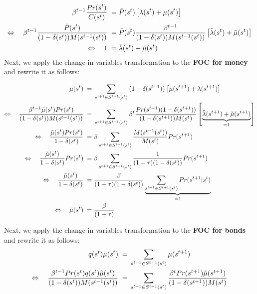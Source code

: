 \documentclass[a4paper, 12pt]{article}
\begin{document}
\begin{Answer}
	\begin{align}%
		\beta^{t-1} \frac{Pr(s^t)}{C(s^t)} \; = & \; \bar{P}(s^t) \left[ \lambda(s^t) + \mu(s^t) \right]\notag\\%
		\Leftrightarrow \quad \beta^{t-1} \frac{\bar{P}(s^t)}{(1-\delta(s^t)) M(s^{t-1}(s^t))} \; = & \; \bar{P}(s^t) \frac{\beta^{t-1}}{(1-\delta(s^t)) M(s^{t-1}(s^t))} \left[ \tilde{\lambda}(s^t) + \tilde{\mu}(s^t) \right]\notag\\%
		\Leftrightarrow \quad 1 \; = & \; \tilde{\lambda}(s^t) + \tilde{\mu}(s^t)\label{eq:foc_consumption}%
	\end{align}%
	Next, we apply the change-in-variables transformation to the \textbf{FOC for money} and rewrite it as follows:%
	\begin{footnotesize}%
	\begin{align}%
		\mu(s^t) \; = & \; \sum_{s^{t+1} \in S^{t+1}(s^t)} \left(1-\delta(s^{t+1}) \right) \left[ \mu(s^{t+1}) + \lambda(s^{t+1}) \right]\notag\\%
		\Leftrightarrow \quad \frac{\beta^{t-1} \tilde{\mu}(s^t) Pr(s^t)}{(1-\delta(s^t)) M(s^{t-1}(s^t))} \; = & \; \sum_{s^{t+1} \in S^{t+1}(s^t)} \beta^t \frac{Pr(s^{t+1})(1-\delta(s^{t+1}))}{(1-\delta(s^{t+1}))M(s^t)} \left[\underbrace{\tilde{\lambda}(s^{t+1}) + \tilde{\mu}(s^{t+1})}_{=1}\right]\notag\\%
		\Leftrightarrow \quad \frac{\tilde{\mu}(s^t) Pr(s^t)}{1-\delta(s^t)} \; = & \; \beta \sum_{s^{t+1} \in S^{t+1}(s^t)} \frac{M(s^{t-1}(s^t))}{M(s^t)} Pr(s^{t+1})\notag\\%
		\Leftrightarrow \quad \frac{\tilde{\mu}(s^t)}{1-\delta(s^t)} Pr(s^t) \; = & \; \beta \sum_{s^{t+1} \in S^{t+1}(s^t)} \frac{1}{(1+\tau)(1-\delta(s^t))} Pr(s^{t+1})\notag\\%
		\Leftrightarrow \quad \frac{\tilde{\mu}(s^t)}{1-\delta(s^t)} \; = & \; \frac{\beta}{(1+\tau)(1-\delta(s^t))} \underbrace{\sum_{s^{t+1} \in S^{t+1}(s^t)} Pr(s^{t+1}|s^t)}_{=1} \notag\\%
		\Leftrightarrow \quad \tilde{\mu}(s^t) \; = & \; \frac{\beta}{(1+\tau)}\label{eq:foc_money}%
	\end{align}%
	\end{footnotesize}%
	Next, we apply the change-in-variables transformation to the \textbf{FOC for bonds} and rewrite it as follows:%
	\begin{align}%
		q(s^t) \mu(s^t) \; = & \; \sum_{s^{t+1} \in S^{t+1}(s^t)} \mu(s^{t+1})\notag\\%
		\Leftrightarrow \quad \frac{\beta^{t-1} Pr(s^t) q(s^t) \tilde{\mu}(s^t)}{(1-\delta(s^t))M(s^{t-1}(s^t))} \; = & \; \sum_{s^{t+1} \in S^{t+1}(s^t)} \frac{\beta^t Pr(s^{t+1}) \tilde{\mu}(s^{t+1})}{(1-\delta(s^{t+1}))M(s^t)}\notag\\%

\end{align}
\end{Answer}
\end{document}
